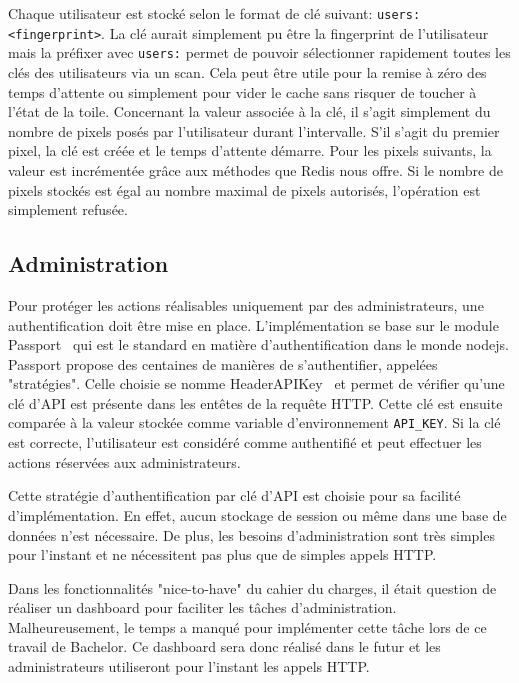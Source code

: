 Chaque utilisateur est stocké selon le format de clé suivant: \texttt{users:<fingerprint>}. La clé aurait simplement pu être la fingerprint de l'utilisateur mais la préfixer avec \texttt{users:} permet de pouvoir sélectionner rapidement toutes les clés des utilisateurs via un scan. Cela peut être utile pour la remise à zéro des temps d'attente ou simplement pour vider le cache sans risquer de toucher à l'état de la toile. Concernant la valeur associée à la clé, il s'agit simplement du nombre de pixels posés par l'utilisateur durant l'intervalle. S'il s'agit du premier pixel, la clé est créée et le temps d'attente démarre. Pour les pixels suivants, la valeur est incrémentée grâce aux méthodes que Redis nous offre. Si le nombre de pixels stockés est égal au nombre maximal de pixels autorisés, l'opération est simplement refusée.

\subsection{Administration}
\label{section:administration}

Pour protéger les actions réalisables uniquement par des administrateurs, une authentification doit être mise en place. L'implémentation se base sur le module Passport~\cite{passport} qui est le standard en matière d'authentification dans le monde \gls{nodejs}. Passport propose des centaines de manières de s'authentifier, appelées "stratégies". Celle choisie se nomme HeaderAPIKey~\cite{passport-headerapikey} et permet de vérifier qu'une clé d'API est présente dans les entêtes de la requête HTTP. Cette clé est ensuite comparée à la valeur stockée comme variable d'environnement \texttt{API_KEY}. Si la clé est correcte, l'utilisateur est considéré comme authentifié et peut effectuer les actions réservées aux administrateurs.

Cette stratégie d'authentification par clé d'API est choisie pour sa facilité d'implémentation. En effet, aucun stockage de session ou même dans une base de données n'est nécessaire. De plus, les besoins d'administration sont très simples pour l'instant et ne nécessitent pas plus que de simples appels HTTP.

Dans les fonctionnalités "nice-to-have" du cahier du charges, il était question de réaliser un dashboard pour faciliter les tâches d'administration. Malheureusement, le temps a manqué pour implémenter cette tâche lors de ce travail de Bachelor. Ce dashboard sera donc réalisé dans le futur et les administrateurs utiliseront pour l'instant les appels HTTP.

